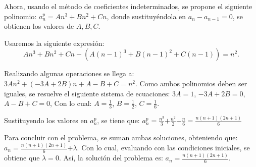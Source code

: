 \documentclass{report}
\begin{document}
Ahora, usando el método de coeficientes indeterminados, se propone el
siguiente polinomio: $a^p_n=An^3+Bn^2+Cn$, donde sustituyéndola en
$a_n-a_{n-1}=0$, se obtienen los valores de $A,B,C$.

Usaremos la siguiente expresión:
\begin{equation}
  \label{polinomial}
   An^3+Bn^2+Cn-(A(n-1)^3+B(n-1)^2+C(n-1))=n^2.  
\end{equation}

Realizando algunas operaciones se llega a:
$3An^2+(-3A+2B)n+A-B+C=n^2$.
Como ambos polinomios deben ser iguales, se resuelve el siguiente sistema de ecuaciones:
$3A=1$,
$-3A+2B=0$,
$A-B+C=0$,
Con lo cual: $A=\frac{1}{3}$, $B=\frac{1}{2}$, $C=\frac{1}{6}$.

Sustituyendo los valores en $a^p_n$, se tiene que:
$a^p_n=\frac{n^3}{3}$$+\frac{n^2}{2}$$+\frac{n}{6}=$$\frac{n(n+1)(2n+1)}{6}$

Para concluir con el problema, se suman ambas soluciones, obteniendo que:
$a_n=\frac{n(n+1)(2n+1)}{6}$$+\lambda$.
Con lo cual, evaluando con las condiciones iniciales, se obtiene que $\lambda$$=0$.
Así, la solución del problema es:
$a_n=\frac{n(n+1)(2n+1)}{6}$.
\end{document}
